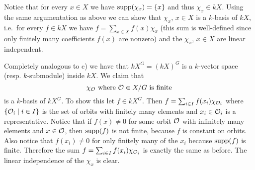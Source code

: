 Notice that for every $x \in X$ we have $\operatorname{supp}(\chi_x) = \{x\}$ and thus $\chi_x \in kX$. Using the same argumentation as above we can show that $\chi_x$, $x \in X$ is a $k$-basis of $kX$, i.e.\ for every $f \in kX$ we have $f = \sum_{x \in X} f(x) \chi_x$ (this sum is well-defined since only finitely many coefficients $f(x)$ are nonzero) and the $\chi_x$, $x \in X$ are linear independent.

Completely analogous to c) we have that $kX^G = (kX)^G$ is a $k$-vector space (resp. $k$-submodule) inside $kX$. We claim that
\[
 \chi_\mathcal{O} \text{ where } \mathcal{O} \in X/G \text{ is finite}
\]
is a $k$-basis of $kX^G$. To show this let $f \in kX^G$. Then $f = \sum_{i \in I} f(x_i) \chi_{\mathcal{O}_i}$ where $\{\mathcal{O}_i \mid i \in I\}$ is the set of orbits with finitely many elements and $x_i \in \mathcal{O}_i$ is a representative. Notice that if $f(x) \neq 0$ for some orbit $\mathcal{O}$ with infinitely many elements and $x \in \mathcal{O}$, then $\operatorname{supp}(f)$ is not finite, because $f$ is constant on orbits. Also notice that $f(x_i) \neq 0$ for only finitely many of the $x_i$ because $\operatorname{supp}(f)$ is finite. Therefore the sum $f = \sum_{i \in I} f(x_i) \chi_{\mathcal{O}_i}$ is exactly the same as before. The linear independence of the $\chi_x$ is clear.


